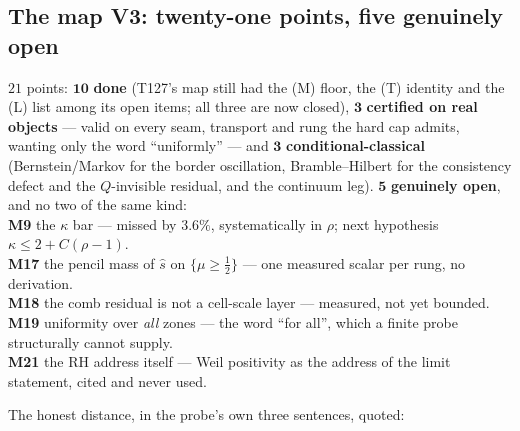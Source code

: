 \documentclass[11pt,a4paper]{article}
\begin{document}
\subsection{The map V3: twenty-one points, five genuinely open}
\begin{keybox}
$21$ points: $\mathbf{10}$ \textbf{done} (T127's map still had the (M) floor, the (T) identity
and the (L) list among its open items; all three are now closed), $\mathbf{3}$
\textbf{certified on real objects} --- valid on every seam, transport and rung the hard cap
admits, wanting only the word ``uniformly'' --- and $\mathbf{3}$ \textbf{conditional-classical}
(Bernstein/Markov for the border oscillation, Bramble--Hilbert for the consistency defect and the
$Q$-invisible residual, and the continuum leg). $\mathbf{5}$ \textbf{genuinely open}, and no two
of the same kind:\\[3pt]
\textbf{M9} the $\kappa$ bar --- missed by $3.6\%$, systematically in $\rho$; next hypothesis
$\kappa\le2+C(\rho-1)$.\\
\textbf{M17} the pencil mass of $\hat s$ on $\{\mu\ge\tfrac12\}$ --- one measured scalar per
rung, no derivation.\\
\textbf{M18} the comb residual is not a cell-scale layer --- measured, not yet bounded.\\
\textbf{M19} uniformity over \emph{all} zones --- the word ``for all'', which a finite probe
structurally cannot supply.\\
\textbf{M21} the RH address itself --- Weil positivity as the address of the limit statement,
cited and never used.
\end{keybox}

\noindent The honest distance, in the probe's own three sentences, quoted:
\end{document}
